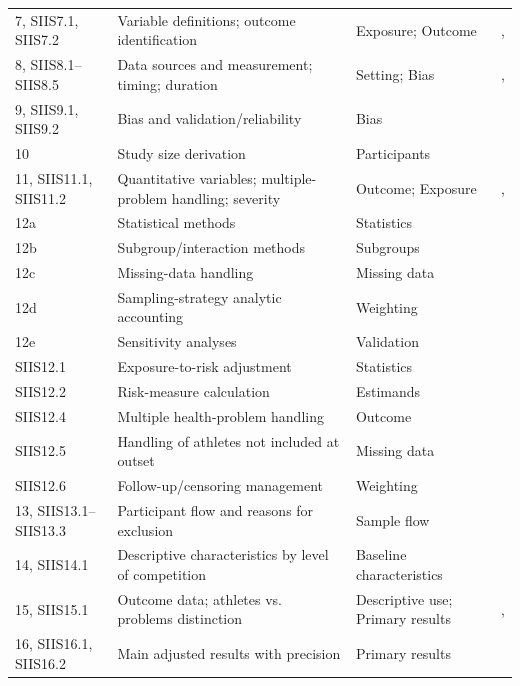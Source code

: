 \begin{longtable}{p{1.9cm} p{5.9cm} p{2.6cm} p{1.4cm}}
7, SIIS7.1, SIIS7.2 & Variable definitions; outcome identification & Exposure; Outcome & \pageref{sec:exposure}, \pageref{sec:outcome} \\
8, SIIS8.1--SIIS8.5 & Data sources and measurement; timing; duration & Setting; Bias & \pageref{sec:setting}, \pageref{sec:bias} \\
9, SIIS9.1, SIIS9.2 & Bias and validation/reliability & Bias & \pageref{sec:bias} \\
10 & Study size derivation & Participants & \pageref{sec:participants} \\
11, SIIS11.1, SIIS11.2 & Quantitative variables; multiple-problem handling; severity & Outcome; Exposure & \pageref{sec:outcome}, \pageref{sec:exposure} \\
12a & Statistical methods & Statistics & \pageref{sec:statistics} \\
12b & Subgroup/interaction methods & Subgroups & \pageref{sec:subgroups} \\
12c & Missing-data handling & Missing data & \pageref{sec:missing} \\
12d & Sampling-strategy analytic accounting & Weighting & \pageref{sec:weighting} \\
12e & Sensitivity analyses & Validation & \pageref{sec:validation} \\
SIIS12.1 & Exposure-to-risk adjustment & Statistics & \pageref{sec:statistics} \\
SIIS12.2 & Risk-measure calculation & Estimands & \pageref{sec:estimands} \\
SIIS12.4 & Multiple health-problem handling & Outcome & \pageref{sec:outcome} \\
SIIS12.5 & Handling of athletes not included at outset & Missing data & \pageref{sec:missing} \\
SIIS12.6 & Follow-up/censoring management & Weighting & \pageref{sec:weighting} \\
13, SIIS13.1--SIIS13.3 & Participant flow and reasons for exclusion & Sample flow & \pageref{sec:results-flow} \\
14, SIIS14.1 & Descriptive characteristics by level of competition & Baseline characteristics & \pageref{sec:results-table1} \\
15, SIIS15.1 & Outcome data; athletes vs. problems distinction & Descriptive use; Primary results & \pageref{sec:results-descriptive}, \pageref{sec:results-primary} \\
16, SIIS16.1, SIIS16.2 & Main adjusted results with precision & Primary results & \pageref{sec:results-primary} \\

\end{longtable}
